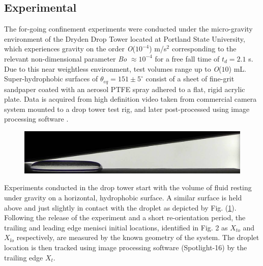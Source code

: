 \documentclass{article}
\begin{document}
\subsection*{Experimental}
The for-going confinement experiments were conducted under the micro-gravity environment of the Dryden Drop Tower located at Portland State University, which experiences gravity on the order \textit{O}($10^{-4}$) m/s$^2$ corresponding to the relevant non-dimensional parameter \textit{Bo} $\approx 10^{-4}$ for a free fall time of $t_d = 2.1$ s. Due to this near weightless environment, test volumes range up to \textit{O}($10$) mL. Super-hydrophobic surfaces of $\theta_{eq} = 151 \pm 5^{\circ}$ consist of a sheet of fine-grit sandpaper coated with an aerosol PTFE spray adhered to a flat, rigid acrylic plate. Data is acquired from high definition video taken from commercial camera system \cite{Camera} mounted to a drop tower test rig, and later post-processed using image processing software \cite{Software2004}.

\begin{figure}
	\centering
	\includegraphics[scale=0.4]{Figures/initialcondition}
	\caption{}
	\label{fig:initial}
\end{figure}

Experiments conducted in the drop tower start with the volume of fluid resting under gravity on a horizontal, hydrophobic surface. A similar surface is held above and just slightly in contact with the droplet as depicted by Fig. (\ref{fig:initial}). Following the release of the experiment and a short re-orientation period, the trailing and leading edge menisci initial locations, identified in Fig. 2 as $X_{to}$ and $X_{lo}$ respectively, are measured by the known geometry of the system. The droplet location is then tracked using image processing software (Spotlight-16) by the trailing edge $X_t$.
\end{document}
